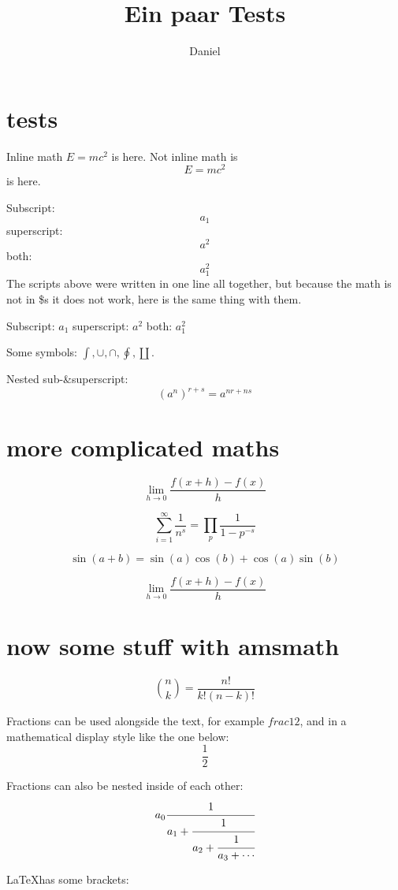 \documentclass[12p]{article}
\begin{document}
\title{Ein paar Tests}
\author{Daniel}
\maketitle
{}



\section{tests}
Inline math $E=mc^2$ is here.
Not inline math is \[E=mc^2\] is here.

Subscript: \[ a_1\] superscript: \[ a^2\] both: \[ a_1^2 \]
The scripts above were written in one line all together, but because the math is
not in \$s it does not work, here is the same thing with them.

Subscript: $a_1$ superscript: $a^2$ both: $a_1^2$

Some symbols: $\int, \cup, \cap, \oint, \coprod$.

Nested sub-\&superscript:
\[(a^n)^{r+s}=a^{nr+ns}\]


\section{more complicated maths}
\[\lim_{h \rightarrow 0} \frac{f(x+h)-f(x)}{h}\] 

\[\sum_{i=1}^{\infty} \frac{1}{n^s}
=\prod_p \frac{1}{1-p^{-s}}
\]

\[
\sin(a+b)=\sin(a)\cos(b)+\cos(a)\sin(b)
\]

\[
\lim_{h \rightarrow 0} \frac{f(x+h)-f(x)}{h}
\]


\section{now some stuff with amsmath}

\[
\binom{n}{k}=\frac{n!}{k!(n-k)!}
\]

Fractions can be used alongside the text, for example $frac{1}{2}$, and in a
mathematical display style like the one below: \[\frac{1}{2}\]

Fractions can also be nested inside of each other:
\[
a_0\cfrac{1}{a_1+\cfrac{1}{a_2+\cfrac{1}{a_3+\cdots}}}
\]

\LaTeX has some brackets:
\end{document}
